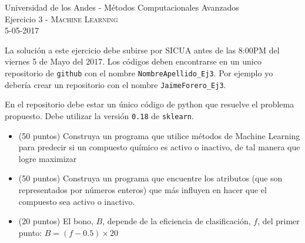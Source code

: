 \documentclass[11pt,letterpaper]{exam}
\begin{document}
\begin{center}
{\Large Universidad de los Andes - M\'etodos Computacionales Avanzados} \\
Ejercicio 3 - \textsc{Machine Learning}\\
5-05-2017\\
\end{center}



\vspace{0.3cm}


\noindent
La solución a este ejercicio debe subirse por SICUA antes de las 8:00PM
del viernes 5 de Mayo del 2017. 
Los c\'odigos deben encontrarse en un unico repositorio de \verb'github'
con el nombre \verb"NombreApellido_Ej3". Por ejemplo yo deber\'ia
crear un repositorio con el nombre
\verb"JaimeForero_Ej3". 

\noindent

En el repositorio debe estar un \'unico c\'odigo de python que
resuelve el problema propuesto. Debe utilizar la versi\'on \verb"0.18" de \verb"sklearn".

\vspace{0.3cm}

\begin{questions}
\begin{itemize}
Utilizando los siguientes conjuntos de datos \url{http://archive.ics.uci.edu/ml/datasets/Dorothea}
\item (50 puntos) Construya un programa que utilice m\'etodos de Machine Learning para predecir si un compuesto qu\'imico es activo o inactivo, de tal manera que logre maximizar 
\item (50 puntos) Construya un programa que encuentre los atributos (que son representados por n\'umeros enteros) que m\'as influyen en hacer que el compuesto sea activo o inactivo.
\item (20 puntos) El bono, $B$, depende de la eficiencia de clasificaci\'on, $f$, del primer punto: $B = (f-0.5)\times 20$
\end{itemize}
\end{questions}
\end{document}

